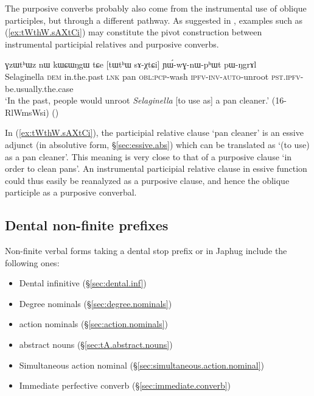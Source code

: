 The purposive converbs probably also come from the instrumental use of oblique participles, but through a different pathway. As suggested in \citet[272]{jacques14linking}, examples such as (\ref{ex:tWthW.sAXtCi}) may constitute the pivot construction between instrumental participial relatives and purposive converbs.


\begin{exe}
\ex \label{ex:tWthW.sAXtCi}
\gll ɣzɯtʰɯz nɯ kɯɕɯŋgɯ tɕe [tɯtʰɯ sɤ-χtɕi] ɲɯ́-wɣ-nɯ-pʰɯt pɯ-ŋgrɤl \\
Selaginella \textsc{dem} in.the.past \textsc{lnk} pan \textsc{obl}:\textsc{pcp}-wash \textsc{ipfv}-\textsc{inv}-\textsc{auto}-unroot \textsc{pst}.\textsc{ipfv}-be.usually.the.case \\
\glt `In the past, people would unroot \textit{Selaginella} [to use as] a pan cleaner.' (16-RlWmsWsi)
()
\end{exe}

In (\ref{ex:tWthW.sAXtCi}), the participial relative clause  `pan cleaner' is an essive adjunct (in absolutive form, §\ref{sec:essive.abs}) which can be translated as `(to use) as a pan cleaner'. This meaning is very close to that of a purposive clause `in order to clean pans'. An instrumental participial relative clause in essive function could thus easily be reanalyzed as a purposive clause, and hence the oblique participle as a purposive converbal.


\subsection{Dental non-finite prefixes} \label{sec:dental.nmlz.history}
Non-finite verbal forms taking a dental stop prefix  or  in Japhug include the following ones:

\begin{itemize}
\item Dental infinitive (§\ref{sec:dental.inf})
\item Degree nominals (§\ref{sec:degree.nominals})
\item {} action nominals (§\ref{sec:action.nominals})
\item {} abstract nouns (§\ref{sec:tA.abstract.nouns})
\item Simultaneous action nominal (§\ref{sec:simultaneous.action.nominal})
\item Immediate perfective converb (§\ref{sec:immediate.converb})
\end{itemize}



